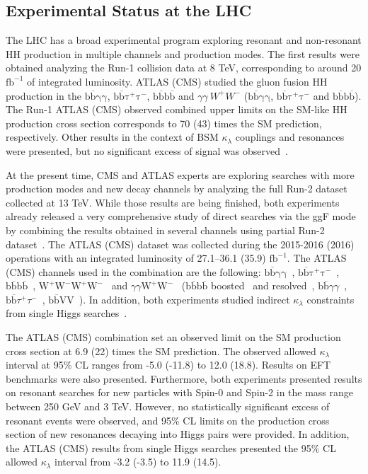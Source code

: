 \subsection{Experimental Status at the LHC}
The LHC has a broad experimental program exploring resonant and non-resonant HH production in multiple channels and production modes. The first results were obtained analyzing the Run-1 collision data at 8 TeV, corresponding to around 20$\mathrm{fb^{-1}}$ of integrated luminosity. ATLAS (CMS) studied the gluon fusion HH production in the  $\mathrm{b\overline{b}\gamma\gamma}$, $\mathrm{b\overline{b}\tau^{+}\tau^{-}}$, $\mathrm{b\overline{b}b\overline{b}}$ and $\gamma\gamma~W^{+}W^{-}$ ($\mathrm{b\overline{b}\gamma\gamma}$, $\mathrm{b\overline{b}\tau^{+}\tau^{-}}$ and $\mathrm{b\overline{b}b\overline{b}}$). The Run-1 ATLAS (CMS) observed combined upper limits on the SM-like HH production cross section corresponds to 70 (43) times the SM prediction, respectively. Other results in the context of BSM $\kappa_{\lambda}$ couplings and resonances were presented, but no significant excess of signal was observed~\cite{atlashhrun1comb,cmshhrun1comb}.

At the present time, CMS and ATLAS experts are exploring searches with more production modes and new decay channels by analyzing the full Run-2 dataset collected at 13 TeV. While those results are being finished, both experiments already released a very comprehensive study of direct searches via the ggF mode by combining the results obtained in several channels using partial Run-2 dataset~\cite{atlascomb,cmscomb}. The ATLAS (CMS) dataset was collected during the 2015-2016 (2016) operations with an integrated luminosity of 27.1--36.1 (35.9) $\mathrm{fb^{-1}}$. The ATLAS (CMS) channels used in the combination are the following: $\mathrm{b\overline{b}\gamma\gamma}$~\cite{bbggatlas}, $\mathrm{b\overline{b}\tau^{+}\tau^{-}}$~\cite{bbttatlas1}, $\mathrm{b\overline{b}b\overline{b}}$~\cite{bbbbatlas}, $\mathrm{W^{+}W^{-}W^{+}W^{-}}$~\cite{atlaswwww} and $\gamma\gamma\mathrm{W^{+}W^{-}}$~\cite{atlasggww} ($\mathrm{b\overline{b}b\overline{b}}$ boosted~\cite{bbbbcmsr2} and resolved~\cite{bbbbcmsnr,bbbbcmsr1}, $\mathrm{b\overline{b}}\gamma\gamma$~\cite{bbggcms}, $\mathrm{b\overline{b}}\tau^{+}\tau^{-}$~\cite{bbttcms1,bbttcms2}, $\mathrm{b\overline{b}VV}$~\cite{cmsbbvv}). In addition, both experiments studied indirect $\kappa_{\lambda}$ constraints from single Higgs searches~\cite{cmsrun2mes,atlasindirecthh}.

The ATLAS (CMS) combination set an observed limit on the SM production cross section at 6.9 (22) times the SM prediction. The observed allowed $\kappa_{\lambda}$ interval at 95\% CL ranges from -5.0 (-11.8) to 12.0 (18.8). Results on EFT benchmarks were also presented. Furthermore, both experiments presented results on resonant searches for new particles with Spin-0 and Spin-2 in the mass range between 250 GeV and 3 TeV. However, no statistically significant excess of resonant events were observed, and 95\% CL limits on the production cross section of new resonances decaying into Higgs pairs were provided. In addition, the ATLAS (CMS) results from single Higgs searches presented the 95\% CL allowed $\kappa_{\lambda}$ interval from -3.2 (-3.5) to 11.9 (14.5).

